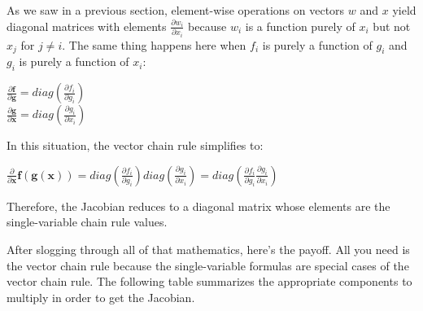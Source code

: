 \documentclass[11pt]{article}
\begin{document}
As we saw in a previous section, element-wise operations on vectors $w$ and $x$ yield diagonal matrices with elements $\frac{\partial w_i}{\partial x_i}$ because $w_i$ is a function purely of $x_i$ but not $x_j$ for $j \neq i$. The same thing happens here when $f_i$ is purely a function of $g_i$ and $g_i$ is purely a function of $x_i$:

$\frac{\partial \mathbf{f}}{\partial \mathbf{g}} = diag(\frac{\partial f_i}{\partial g_i})$\\
$\frac{\partial \mathbf{g}}{\partial \mathbf{x}} = diag(\frac{\partial g_i}{\partial x_i})$

In this situation, the vector chain rule simplifies to:

$\frac{\partial}{\partial \mathbf{x}} \mathbf{f}(\mathbf{g}(\mathbf{x})) = diag(\frac{\partial f_i}{\partial g_i})diag(\frac{\partial g_i}{\partial x_i}) = diag(\frac{\partial f_i}{\partial g_i}\frac{\partial g_i}{\partial x_i})$

Therefore, the Jacobian reduces to a diagonal matrix whose elements are the single-variable chain rule values.

After slogging through all of that mathematics, here's the payoff. All you need is the vector chain rule because the single-variable formulas are special cases of the vector chain rule. The following table summarizes the appropriate components to multiply in order to get the Jacobian.
\end{document}

